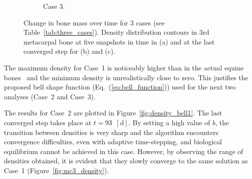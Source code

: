 \documentclass[review]{elsarticle}
\numberwithin{equation}{section}
\begin{document}
\begin{figure}[h]
\begin{subfigure}[b]{0.475\textwidth}
		\caption{ Case 3. }    
		\label{fig:density_bell2}
	\end{subfigure}
	\quad
	\begin{subfigure}[b]{0.475\textwidth}   
	\end{subfigure}
	\caption{Change in bone mass over time for 3 cases (see Table~\ref{tab:three_cases}). Density distribution contours in 3rd metacarpal bone at five snapshots in time in (a) and at the last converged step for (b) and (c).} 
	\label{fig:density_changes_}
\end{figure}

The maximum density for Case~1 is noticeably higher than in the actual equine bones~\citep{yamada2015experimental} and the minimum density is unrealistically close to zero. This justifies the proposed bell shape function (Eq.~(\ref{eq:bell_function})) used for the next two analyses (Case~2 and Case~3). 

The results for Case~2 are plotted in Figure~\ref{fig:density_bell1}.
The last converged step takes place at $t=93$~$[{\text{d}}]$. 
By setting a high value of $b$, the transition between densities is very sharp and the algorithm encounters convergence difficulties, even with adaptive time-stepping, and biological equilibrium cannot be achieved in this case. 
However, by observing the range of densities obtained, it is evident that they slowly converge to the same solution as Case~1 (Figure~\ref{fig:mc3_density}). 
\end{document}
